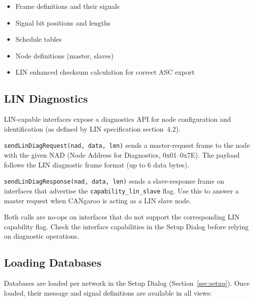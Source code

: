 \documentclass[a4paper,11pt]{article}
\begin{document}
\begin{itemize}
  \item Frame definitions and their signals
  \item Signal bit positions and lengths
  \item Schedule tables
  \item Node definitions (master, slaves)
  \item LIN enhanced checksum calculation for correct ASC export
\end{itemize}

\subsection{LIN Diagnostics}
\label{sec:lindiag}

LIN-capable interfaces expose a diagnostics API for node configuration and
identification (as defined by LIN specification section~4.2).

\begin{description}[leftmargin=2em, style=nextline]
  \item[Diagnostic Request (master)]
    \texttt{sendLinDiagRequest(nad, data, len)} sends a master-request frame
    to the node with the given NAD (Node Address for Diagnostics, 0x01--0x7E).
    The payload follows the LIN diagnostic frame format (up to 6 data bytes).

  \item[Diagnostic Response (slave)]
    \texttt{sendLinDiagResponse(nad, data, len)} sends a slave-response frame
    on interfaces that advertise the \texttt{capability\_lin\_slave} flag.
    Use this to answer a master request when CANgaroo is acting as a LIN slave node.
\end{description}

\begin{notebox}
Both calls are no-ops on interfaces that do not support the corresponding
LIN capability flag. Check the interface capabilities in the Setup Dialog
before relying on diagnostic operations.
\end{notebox}

\subsection{Loading Databases}

Databases are loaded per network in the Setup Dialog (Section~\ref{sec:setup}).
Once loaded, their message and signal definitions are available in all views:
\end{document}
